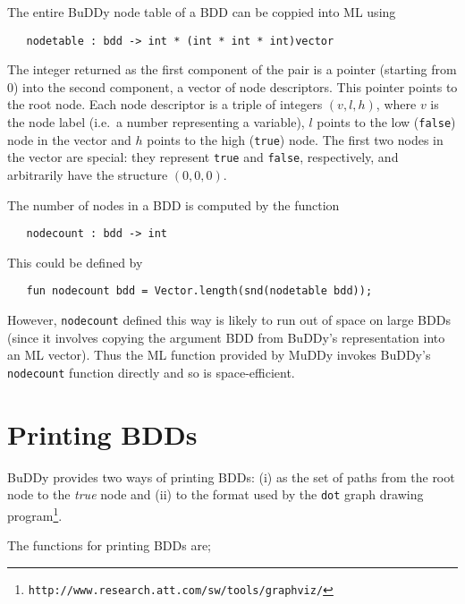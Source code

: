 \documentclass[12pt]{article}
\newcommand{\bnind}[1]{\index[MLbn]{#1}}
\renewcommand{\t}[1]{\mbox{\tt #1}}
\newcommand{\ty}[1]{\mbox{\tt #1}}
\newcommand{\ml}[1]{{\tt #1}}
\newcommand{\Buddy}{BuDDy\xspace}
\newcommand{\Muddy}{MuDDy\xspace}
\newcommand\fun{\mbox{\tt{->}}}
\renewcommand{\prod}{\mbox{\tt{*}}}
\begin{document}
The entire \Buddy{} node table of a BDD can be coppied into ML using

%
%

\begin{verbatim}
   nodetable : bdd -> int * (int * int * int)vector
\end{verbatim}\bnind{\ml{nodetable}}

The integer returned as the first component of the pair is a pointer
(starting from 0) into the second component, a vector of node
descriptors. This pointer points to the root node. Each node
descriptor is a triple of integers $(v,l,h)$, where $v$ is the node
label (i.e.~a number representing a variable), $l$ points to the low
({\t{false}}) node in the vector and $h$ points to the high
({\t{true}}) node. The first two nodes in the vector are special:
they represent {\t{true}} and {\t{false}}, respectively, and arbitrarily have
the structure $(0,0,0)$.

The number of nodes in a BDD is computed by the function

\begin{verbatim}
   nodecount : bdd -> int
\end{verbatim}\bnind{\ml{nodecount}}

This could be defined by

\begin{verbatim}
   fun nodecount bdd = Vector.length(snd(nodetable bdd));
\end{verbatim}

However, \t{nodecount} defined this way is likely to run out of space
on large BDDs (since it involves copying the argument BDD from
\Buddy's representation into an ML vector).  Thus the ML function
provided by \Muddy{} invokes \Buddy's \t{nodecount} function directly
and so is space-efficient.

\section{Printing BDDs}

\Buddy{} provides two ways of printing BDDs: (i) as the set of paths from
the root node to the {\it{true}} node and (ii) to the format used by
the \t{dot} graph drawing
program\footnote{\tt{http://www.research.att.com/sw/tools/graphviz/}}.

The functions for printing BDDs are;
\end{document}

